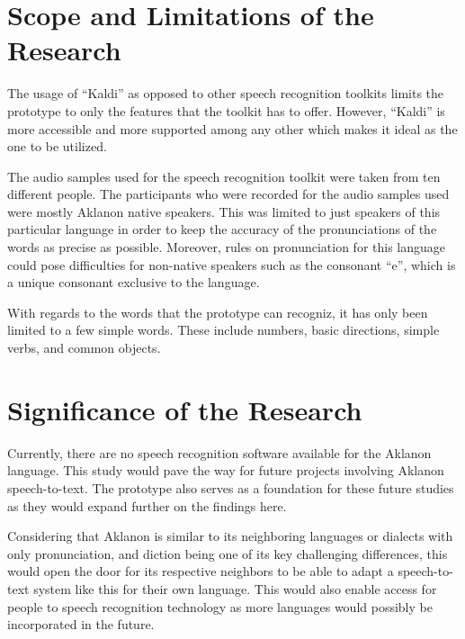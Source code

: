 \section{Scope and Limitations of the Research}

The usage of “Kaldi” as opposed to other speech recognition toolkits limits the prototype to only the features that the toolkit has to offer. However, “Kaldi” is more accessible and more supported among any other which makes it ideal as the one to be utilized.

The audio samples used for the speech recognition toolkit were taken from ten different people. The participants who were recorded for the audio samples used were mostly Aklanon native speakers. This was limited to just speakers of this particular language in order to keep the accuracy of the pronunciations of the words as precise as possible. Moreover, rules on pronunciation for this language could pose difficulties for non-native speakers such as the consonant “e”, which is a unique consonant exclusive to the language. 

With regards to the words that the prototype can recogniz, it has only been limited to a few simple words. These include numbers, basic directions, simple verbs, and common objects. 

\section{Significance of the Research}

Currently, there are no speech recognition software available for the Aklanon language. This study would pave the way for future projects involving Aklanon speech-to-text. The prototype also serves as a foundation for these future studies as they would expand further on the findings here. 

Considering that Aklanon is similar to its neighboring languages or dialects with only pronunciation, and diction being one of its key challenging differences, this would open the door for its respective neighbors to be able to adapt a speech-to-text system like this for their own language. This would also enable access for people to speech recognition technology as more languages would possibly be incorporated in the future.



